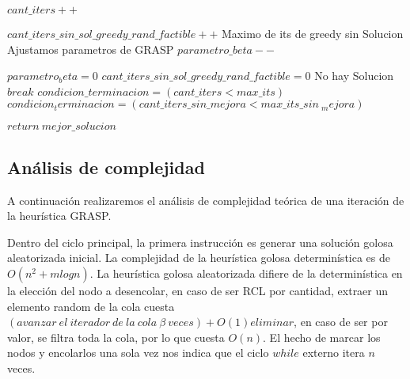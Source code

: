 \begin{algorithmic}[1]
	        	    	
	        	\EndIf
	
	        	\State $cant\_iters++$
	    	
	    	    	\Else
	    	    	\State $cant\_iters\_sin\_sol\_greedy\_rand\_factible++$
	    	    		\Comment Maximo de its de greedy sin Solucion
	    	    	            	\Comment Ajustamos parametros de GRASP
	    	    	                \State $parametro\_beta--$
	    	    	            \EndIf
	
	        	    	\State $parametro_beta = 0$
	        		\EndIf
	        		\State $cant\_iters\_sin\_sol\_greedy\_rand\_factible = 0$
	        	\EndIf
        	\EndIf
        \Else
        \Comment No hay Solucion
        	\State $break$
        \EndIf	
           \State $condicion\_terminacion = (cant\_iters < max\_its)$            
            \State $condicion_terminacion = (cant\_iters\_sin\_mejora < max\_its\_sin\ _mejora)$
        \EndIf

       \EndWhile

       \State $return\:  mejor\_solucion$

\EndProcedure
\end{algorithmic}


\subsection{An\'alisis de complejidad}

A continuaci\'on realizaremos el an\'alisis de complejidad te\'orica de una iteraci\'on de la heur\'istica GRASP.
\vspace{2mm}


 Dentro del ciclo principal, la primera instrucci\'on es generar una soluci\'on golosa aleatorizada inicial. La complejidad de la heur\'istica golosa determin\'istica es de $O(n^2 + m log n)$. La heur\'istica golosa aleatorizada difiere de la determin\'istica en la elecci\'on del nodo a desencolar, en caso de ser RCL por cantidad, extraer un elemento random de la cola cuesta $(avanzar\: el\: iterador\: de\: la \:cola \:\beta\:veces)+O(1) eliminar$, en caso de ser por valor, se filtra toda la cola, por lo que cuesta $O(n)$. El hecho de marcar los nodos y encolarlos una sola vez nos indica que el ciclo $while$ externo itera $n$ veces.

